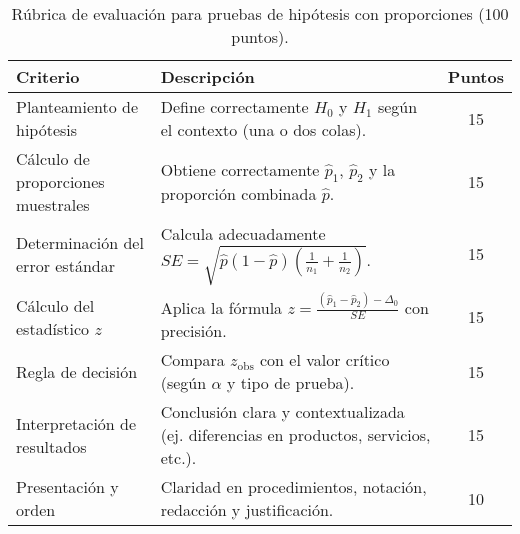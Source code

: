 
\begin{table}[H]
\centering
\renewcommand{\arraystretch}{1.4}
\begin{tabular}{p{} p{} c}
\toprule
\textbf{Criterio} & \textbf{Descripción} & \textbf{Puntos} \\
\midrule
Planteamiento de hipótesis & Define correctamente $H_0$ y $H_1$ según el contexto (una o dos colas). & 15 \\
Cálculo de proporciones muestrales & Obtiene correctamente $\hat{p}_1$, $\hat{p}_2$ y la proporción combinada $\hat{p}$. & 15 \\
Determinación del error estándar & Calcula adecuadamente $SE=\sqrt{\hat{p}(1-\hat{p})(\tfrac{1}{n_1}+\tfrac{1}{n_2})}$. & 15 \\
Cálculo del estadístico $z$ & Aplica la fórmula $z=\tfrac{(\hat{p}_1-\hat{p}_2)-\Delta_0}{SE}$ con precisión. & 15 \\
Regla de decisión & Compara $z_{\text{obs}}$ con el valor crítico (según $\alpha$ y tipo de prueba). & 15 \\
Interpretación de resultados & Conclusión clara y contextualizada (ej. diferencias en productos, servicios, etc.). & 15 \\
Presentación y orden & Claridad en procedimientos, notación, redacción y justificación. & 10 \\
\bottomrule
\end{tabular}
\caption{Rúbrica de evaluación para pruebas de hipótesis con proporciones (100 puntos).}
\end{table}